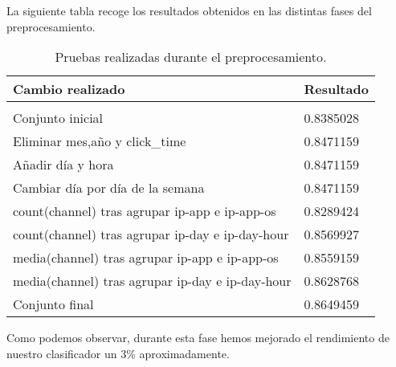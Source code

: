 
\medskip
La siguiente tabla recoge los resultados obtenidos en las distintas fases del preprocesamiento.
\begin{table}[H]
	\centering
	
	\begin{tabular}{ll}
		\textbf{Cambio realizado}& \textbf{Resultado} \\
		\hline
		\\
		Conjunto inicial& 0.8385028     \\
		Eliminar mes,año y click\_time& 0.8471159  \\
		Añadir día y hora&  0.8471159 \\
		Cambiar día por día de la semana & 0.8471159\\
		count(channel) tras agrupar ip-app e ip-app-os & 0.8289424 \\
		count(channel) tras agrupar ip-day e ip-day-hour & 0.8569927 \\
		media(channel) tras agrupar ip-app e ip-app-os & 0.8559159 \\
		media(channel) tras agrupar ip-day e ip-day-hour & 0.8628768 \\
		Conjunto final & 0.8649459
	\end{tabular}
\caption{Pruebas realizadas durante el preprocesamiento.}
\end{table}

Como podemos observar, durante esta fase hemos mejorado el rendimiento de nuestro clasificador un 3\% aproximadamente.
